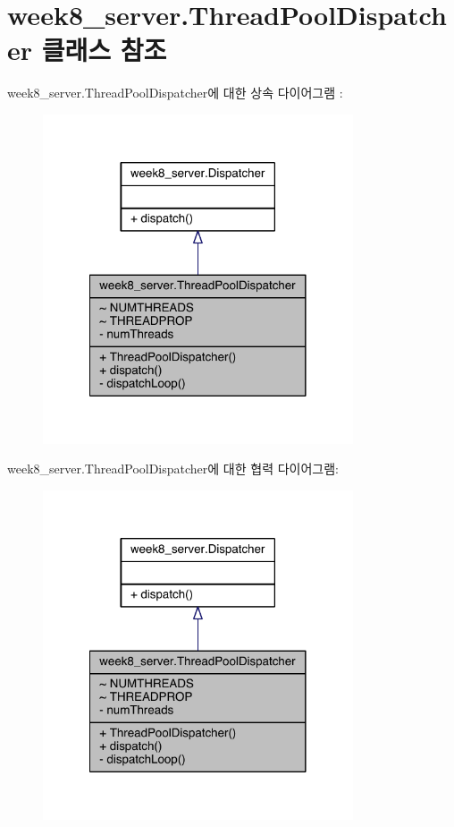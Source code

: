 \hypertarget{classweek8__server_1_1_thread_pool_dispatcher}{\section{week8\-\_\-server.\-Thread\-Pool\-Dispatcher 클래스 참조}
\label{classweek8__server_1_1_thread_pool_dispatcher}
}


week8\-\_\-server.\-Thread\-Pool\-Dispatcher에 대한 상속 다이어그램 \-: 
\nopagebreak
\begin{figure}[H]
\begin{center}
\leavevmode
\includegraphics[width=260pt]{classweek8__server_1_1_thread_pool_dispatcher__inherit__graph}
\end{center}
\end{figure}


week8\-\_\-server.\-Thread\-Pool\-Dispatcher에 대한 협력 다이어그램\-:
\nopagebreak
\begin{figure}[H]
\begin{center}
\leavevmode
\includegraphics[width=260pt]{classweek8__server_1_1_thread_pool_dispatcher__coll__graph}
\end{center}
\end{figure}
